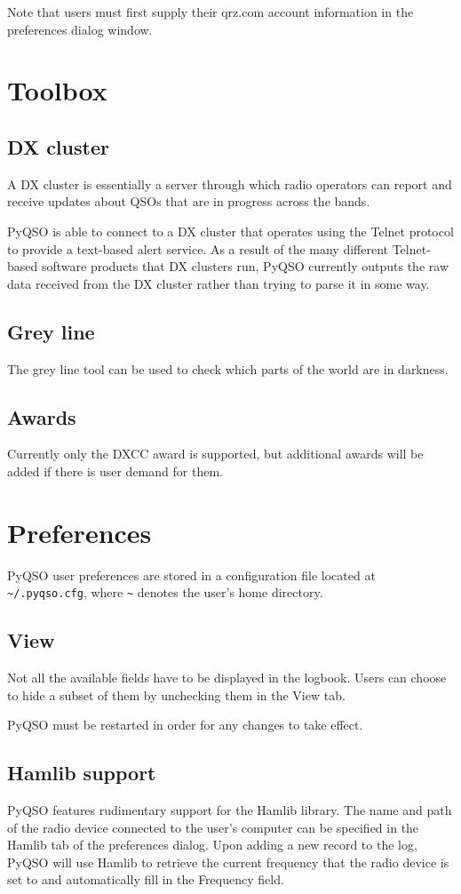 \documentclass[11pt, a4paper]{report}
\begin{document}
Note that users must first supply their qrz.com account information in the preferences dialog window.


\chapter{Toolbox}

\section{DX cluster}
A DX cluster is essentially a server through which radio operators can report and receive updates about QSOs that are in progress across the bands.

PyQSO is able to connect to a DX cluster that operates using the Telnet protocol to provide a text-based alert service. As a result of the many different Telnet-based software products that DX clusters run, PyQSO currently outputs the raw data received from the DX cluster rather than trying to parse it in some way.

\section{Grey line}
The grey line tool can be used to check which parts of the world are in darkness. %

\section{Awards}
Currently only the DXCC award is supported, but additional awards will be added if there is user demand for them.

\chapter{Preferences}
PyQSO user preferences are stored in a configuration file located at \texttt{\textasciitilde/.pyqso.cfg}, where \texttt{\textasciitilde} denotes the user's home directory.

\section{View}
Not all the available fields have to be displayed in the logbook. Users can choose to hide a subset of them by unchecking them in the View tab. 

PyQSO must be restarted in order for any changes to take effect.

\section{Hamlib support}
PyQSO features rudimentary support for the Hamlib library. The name and path of the radio device connected to the user's computer can be specified in the Hamlib tab of the preferences dialog. Upon adding a new record to the log, PyQSO will use Hamlib to retrieve the current frequency that the radio device is set to and automatically fill in the Frequency field. 


\end{document}

